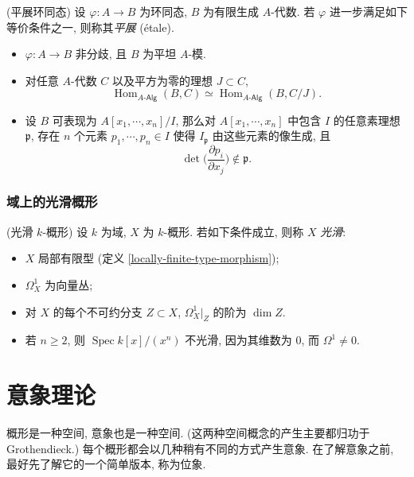 \documentclass{book}
\begin{document}
	\begin{definition}
		{(平展环同态)}
		设 $\varphi \colon A \to B$ 为环同态, $B$ 为有限生成 $A$-代数. 若 $\varphi$ 进一步满足如下等价条件之一, 则称其\emph{平展} (\'etale).
		\begin{itemize}
			\item $\varphi\colon A\to B$ 非分歧, 且 $B$ 为平坦 $A$-模.
			\item 对任意 $A$-代数 $C$ 以及平方为零的理想 $J\subset C$, $$\operatorname{Hom}_{A\text{-}\mathsf{Alg}}(B,C) \simeq \operatorname{Hom}_{A\text{-}\mathsf{Alg}}(B,C/J).$$
			\item 设 $B$ 可表现为 $A[x_1,\cdots,x_n]/I$,
			那么对 $A[x_1,\cdots,x_n]$ 中包含 $I$ 的任意素理想 $\mathfrak p$, 存在 $n$ 个元素 $p_1,\cdots,p_n\in I$ 使得 $I_{\mathfrak p}$ 由这些元素的像生成, 且
			$$\det\Big( \frac{\partial p_i}{\partial x_j} \Big) \notin\mathfrak p.$$
		\end{itemize}
	\end{definition}
	
	
	\subsection{域上的光滑概形}
	
	\begin{definition}
		{(光滑 $k$-概形)}
		设 $k$ 为域, $X$ 为 $k$-概形.
		若如下条件成立, 则称 $X$ \emph{光滑}:
		\begin{itemize}
			\item $X$ 局部有限型 (定义 \ref{locally-finite-type-morphism});
			\item $\Omega^1_{X}$ 为向量丛;
			\item 对 $X$ 的每个不可约分支 $Z\subset X$, $\Omega^1_X|_Z$ 的阶为 $\dim Z$.
		\end{itemize}
	\end{definition}
	
	\begin{example}
		{}
		\begin{itemize}
			\item 若 $n\geq 2$, 则 $\operatorname{Spec} k[x]/(x^n)$ 不光滑, 因为其维数为 $0$, 而 $\Omega^1\neq 0$.
		\end{itemize}
	\end{example}
	
	\chapter{意象理论}
	
	概形是一种空间, 意象也是一种空间. (这两种空间概念的产生主要都归功于 Grothendieck.) 每个概形都会以几种稍有不同的方式产生意象. 在了解意象之前, 最好先了解它的一个简单版本, 称为位象.
	
\end{document}
